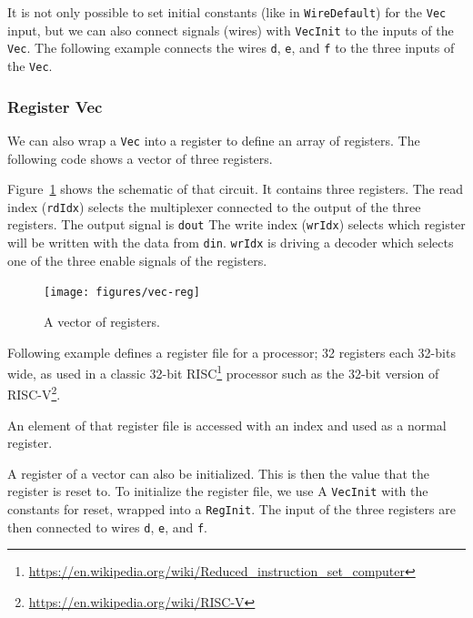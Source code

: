 \documentclass[%
    10pt,
    headinclude, footexclude,
    openright, %
    notitlepage,
    cleardoubleempty,
    headsepline,
    pointlessnumbers,
    bibtotoc, idxtotoc,
    ]{scrbook}
\newcommand{\code}[1]{{\small{\texttt{#1}}}}
\newcommand{\myref}[2]{\href{#1}{#2}}
\renewcommand{\myref}[2]{{#2}{\footnote{\url{#1}}}}
\begin{document}

It is not only possible to set initial constants (like in \code{WireDefault}) for the \code{Vec} input,
but we can also connect signals (wires) with \code{VecInit} to the inputs of the \code{Vec}.
The following example connects the wires \code{d}, \code{e}, and \code{f} to the three
inputs of the \code{Vec}.



\subsubsection{Register Vec}

We can also wrap a \code{Vec} into a register to define an array of registers.
The following code shows a vector of three registers.

Figure~\ref{fig:vec-reg} shows the schematic of that circuit. It contains three registers.
The read index (\code{rdIdx}) selects the multiplexer connected to the output of the three
registers. The output signal is \code{dout}
The write index (\code{wrIdx}) selects which register will be written with the data
from \code{din}. \code{wrIdx} is driving a decoder which selects one of the three
enable signals of the registers.

\begin{figure}[t]
  \centering
  \texttt{[image: figures/vec-reg]}
  \caption{A vector of registers.}
  \label{fig:vec-reg}
\end{figure}


Following example defines a register file for a processor; 32 registers
each 32-bits wide, as used in a classic 32-bit
\myref{https://en.wikipedia.org/wiki/Reduced_instruction_set_computer}{RISC}
processor such as the 32-bit version of \myref{https://en.wikipedia.org/wiki/RISC-V}{RISC-V}.


\noindent An element of that register file is accessed with an index and used as a normal register.


A register of a vector can also be initialized. This is then the value that the register is reset to.
To initialize the register file, we use A \code{VecInit} with the constants for reset, wrapped
into a \code{RegInit}. The input of the three registers are then connected to wires \code{d},
\code{e}, and \code{f}.
\end{document}
